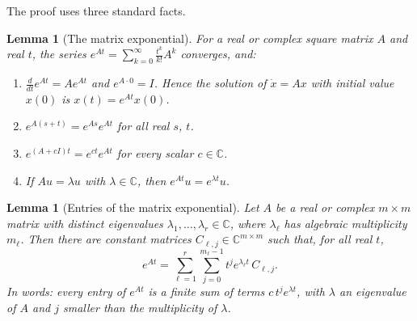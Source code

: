 \documentclass[11pt]{article}
\newtheorem{lemma}[theorem]{Lemma}
\theoremstyle{definition}
\theoremstyle{remark}
\newcommand{\C}{\mathbb{C}}
\begin{document}
The proof uses three standard facts.

\begin{lemma}[The matrix exponential]\label{lem:exp}
For a real or complex square matrix $A$ and real $t$, the series
$e^{At} = \sum_{k=0}^{\infty} \frac{t^k}{k!} A^k$ converges, and:
\begin{enumerate}
  \item\label{lem:exp:ode} $\frac{d}{dt} e^{At} = A e^{At}$ and $e^{A \cdot 0} = I$. Hence the
        solution of $\dot{x} = Ax$ with initial value $x(0)$ is $x(t) = e^{At} x(0)$.
  \item\label{lem:exp:semigroup} $e^{A(s+t)} = e^{As} e^{At}$ for all real $s$, $t$.
  \item\label{lem:exp:shift} $e^{(A + cI)t} = e^{ct} e^{At}$ for every scalar $c \in \C$.
  \item\label{lem:exp:eig} If $Au = \lambda u$ with $\lambda \in \C$, then $e^{At} u = e^{\lambda t} u$.
\end{enumerate}
\end{lemma}

\begin{lemma}[Entries of the matrix exponential]\label{lem:modes}
Let $A$ be a real or complex $m \times m$ matrix with distinct eigenvalues
$\lambda_1, \dots, \lambda_r \in \C$,
where $\lambda_\ell$ has algebraic multiplicity $m_\ell$. Then there are constant matrices
$C_{\ell,j} \in \C^{m \times m}$ such that, for all real $t$,
\begin{equation}\label{eq:modes}
  e^{At} = \sum_{\ell=1}^{r} \sum_{j=0}^{m_\ell - 1} t^{j} e^{\lambda_\ell t}\, C_{\ell,j} .
\end{equation}
In words: every entry of $e^{At}$ is a finite sum of terms $c\, t^{j} e^{\lambda t}$, with
$\lambda$ an eigenvalue of $A$ and $j$ smaller than the multiplicity of $\lambda$.
\end{lemma}
\end{document}
